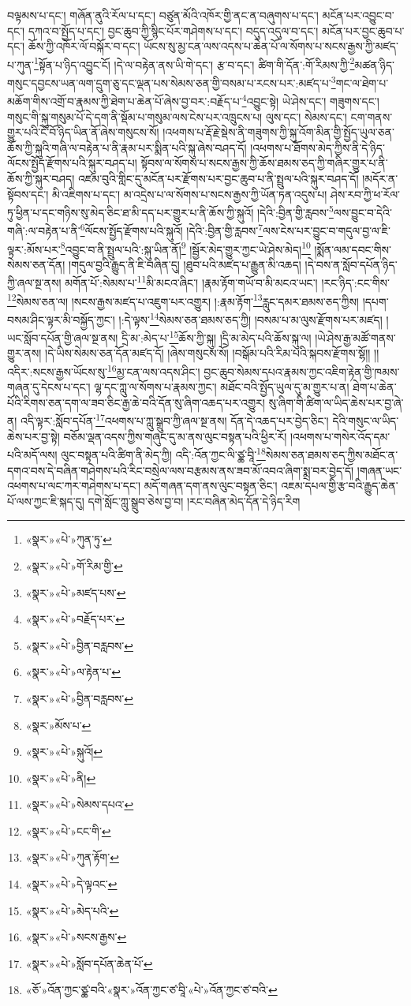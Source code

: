 བལྟམས་པ་དང་། གཞོན་ནུའི་རོལ་པ་དང་། བཙུན་མོའི་འཁོར་གྱི་ནང་ན་བཞུགས་པ་དང་། མངོན་པར་འབྱུང་བ་དང་། དཀའ་བ་སྤྱོད་པ་དང་། བྱང་ཆུབ་ཀྱི་སྙིང་པོར་གཤེགས་པ་དང་། བདུད་འདུལ་བ་དང་། མངོན་པར་བྱང་ཆུབ་པ་དང་། ཆོས་ཀྱི་འཁོར་ལོ་བསྐོར་བ་དང་། ཡོངས་སུ་མྱ་ངན་ལས་འདས་པ་ཆེན་པོ་ལ་སོགས་པ་སངས་རྒྱས་ཀྱི་མཛད་པ་ཀུན་\footnote{«སྣར་»«པེ་»ཀུན་ཏུ་}སྟོན་པ་ཉིད་འབྱུང་ངོ། །དེ་ལ་བརྟེན་ནས་ཡི་གེ་དང་། རྩ་བ་དང་། ཚིག་གི་དོན་:གོ་རིམས་ཀྱི་\footnote{«སྣར་»«པེ་»གོ་རིམ་གྱི་}མཚན་ཉིད་གསུང་དབྱངས་ཡན་ལག་དྲུག་ཅུ་དང་ལྡན་པས་སེམས་ཅན་གྱི་བསམ་པ་རངས་པར་:མཛད་པ་\footnote{«སྣར་»«པེ་»མཛད་པས་}གང་ལ་ཐེག་པ་མཆོག་གིས་འགྲོ་བ་རྣམས་ཀྱི་ཐེག་པ་ཆེན་པོ་ཞེས་བྱ་བར་:བརྗོད་པ་\footnote{«སྣར་»«པེ་»བརྗོད་པར་}འབྱུང་སྟེ། ཡེ་ཤེས་དང་། གཟུགས་དང་། གསུང་གི་སྐུ་གསུམ་པོ་དེ་དག་ནི་སྡོམ་པ་གསུམ་ལས་ངེས་པར་འཁྲུངས་པ། ལུས་དང་། སེམས་དང་། ངག་གནས་གྱུར་པའི་ངོ་བོ་ཉིད་ཡིན་ནོ་ཞེས་གསུངས་སོ། །འཕགས་པ་རྡོ་རྗེ་སྡེས་ནི་གཟུགས་ཀྱི་སྐུ་འོག་མིན་གྱི་སྤྱོད་ཡུལ་ཅན་ཆོས་ཀྱི་སྐུའི་གཞི་ལ་བརྟེན་པ་ནི་རྣམ་པར་སྨིན་པའི་སྐུ་ཞེས་བཤད་དོ། །འཕགས་པ་ཐོགས་མེད་ཀྱིས་ནི་དེ་ཉིད་ལོངས་སྤྱོད་རྫོགས་པའི་སྐུར་བཤད་པ། སྟོབས་ལ་སོགས་པ་སངས་རྒྱས་ཀྱི་ཆོས་ཐམས་ཅད་ཀྱི་གཞིར་གྱུར་པ་ནི་ཆོས་ཀྱི་སྐུར་བཤད། འཛམ་བུའི་གླིང་དུ་མངོན་པར་རྫོགས་པར་བྱང་ཆུབ་པ་ནི་སྤྲུལ་པའི་སྐུར་བཤད་དོ། །མདོར་ན་སྟོབས་དང་། མི་འཇིགས་པ་དང་། མ་འདྲེས་པ་ལ་སོགས་པ་སངས་རྒྱས་ཀྱི་ཡོན་ཏན་འདུས་པ། ཤེས་རབ་ཀྱི་ཕ་རོལ་ཏུ་ཕྱིན་པ་དང་གཉིས་སུ་མེད་ཅིང་ཐ་མི་དད་པར་གྱུར་པ་ནི་ཆོས་ཀྱི་སྐུའོ། །དེའི་:བྱིན་གྱི་རླབས་\footnote{«སྣར་»«པེ་»བྱིན་བརླབས་}ལས་བྱུང་བ་དེའི་གཞི་:ལ་བརྟེན་པ་ནི་\footnote{«སྣར་»«པེ་»ལ་རྟེན་པ་}ལོངས་སྤྱོད་རྫོགས་པའི་སྐུའོ། །དེའི་:བྱིན་གྱི་རླབས་\footnote{«སྣར་»«པེ་»བྱིན་བརླབས་}ལས་ངེས་པར་བྱུང་བ་གདུལ་བྱ་ལ་ཇི་ལྟར་:མོས་པར་\footnote{«སྣར་»མོས་པ་}འབྱུང་བ་ནི་སྤྲུལ་པའི་:སྐུ་ཡིན་ནོ།\footnote{«སྣར་»«པེ་»སྐུའོ།} །སྦྱོར་མེད་གྱུར་ཀྱང་ཡེ་ཤེས་མེད།\footnote{«སྣར་»«པེ་»ནི།} །སྨོན་ལམ་དབང་གིས་སེམས་ཅན་དོན། །གདུལ་བྱའི་རྒྱུད་ནི་ཇི་བཞིན་དུ། །ཐུབ་པའི་མཛད་པ་རྒྱུན་མི་འཆད། །དེ་བས་ན་སློབ་དཔོན་ཉིད་ཀྱི་ཞལ་སྔ་ནས། མགོན་པོ་:སེམས་པ་\footnote{«སྣར་»«པེ་»སེམས་དཔའ་}མི་མངའ་ཞིང་། །རྣམ་རྟོག་གཡོ་བ་མི་མངའ་ཡང་། །རང་ཉིད་:ངང་གིས་\footnote{«སྣར་»«པེ་»ངང་གི་}སེམས་ཅན་ལ། །སངས་རྒྱས་མཛད་པ་འཇུག་པར་འགྱུར། །:རྣམ་རྟོག་\footnote{«སྣར་»«པེ་»ཀུན་རྟོག་}རླུང་དམར་ཐམས་ཅད་ཀྱིས། །དཔག་བསམ་ཤིང་ལྟར་མི་བསྐྱོད་ཀྱང་། །:དེ་ལྟས་\footnote{«སྣར་»«པེ་»དེ་ལྟའང་}སེམས་ཅན་ཐམས་ཅད་ཀྱི། །བསམ་པ་མ་ལུས་རྫོགས་པར་མཛད། །ཡང་སློབ་དཔོན་གྱི་ཞལ་སྔ་ནས། དྲི་མ་:མེད་པ་\footnote{«སྣར་»«པེ་»མེད་པའི་}ཆོས་ཀྱི་སྐུ། །དྲི་མ་མེད་པའི་ཆོས་སྐུ་ལ། །ཡེ་ཤེས་རྒྱ་མཚོ་གནས་གྱུར་ནས། །དེ་ཡིས་སེམས་ཅན་དོན་མཛད་དོ། །ཞེས་གསུངས་སོ། །བསྒོམ་པའི་རིམ་པའི་སྐབས་རྫོགས་སྷོ།། །།འདིར་:སངས་རྒྱས་ཡོངས་སུ་\footnote{«སྣར་»«པེ་»སངས་རྒྱས་}མྱ་ངན་ལས་འདས་ཤིང་། བྱང་ཆུབ་སེམས་དཔའ་རྣམས་ཀྱང་འཇིག་རྟེན་གྱི་ཁམས་གཞན་དུ་དེངས་པ་དང་། ལྷ་དང་ཀླུ་ལ་སོགས་པ་རྣམས་ཀྱང་། མཐོང་བའི་སྤྱོད་ཡུལ་དུ་མ་གྱུར་པ་ན། ཐེག་པ་ཆེན་པོའི་རིགས་ཅན་དག་ལ་ཟབ་ཅིང་རྒྱ་ཆེ་བའི་དོན་སུ་ཞིག་འཆད་པར་འགྱུར། སུ་ཞིག་གི་ཚིག་ལ་ཡིད་ཆེས་པར་བྱ་ཞེ་ན། འདི་ལྟར་:སློབ་དཔོན་\footnote{«སྣར་»«པེ་»སློབ་དཔོན་ཆེན་པོ་}འཕགས་པ་ཀླུ་སྒྲུབ་ཀྱི་ཞལ་སྔ་ནས། དོན་དེ་འཆད་པར་བྱེད་ཅིང་། དེའི་གསུང་ལ་ཡིད་ཆེས་པར་བྱ་སྟེ། བཅོམ་ལྡན་འདས་ཀྱིས་གཞུང་དུ་མ་ནས་ལུང་བསྟན་པའི་ཕྱིར་རོ། །འཕགས་པ་གསེར་འོད་དམ་པའི་མདོ་ལས། ལུང་བསྟན་པའི་ཚིག་ནི་མེད་ཀྱི། འདི་:འོན་ཀྱང་ལི་ཙྪ་བཱི་\footnote{«ཅོ་»འོན་ཀྱང་ཙྪ་བའི་«སྣར་»འོན་ཀྱང་ཙ་བཱི་«པེ་»འོན་ཀྱང་ཙ་བའི་}སེམས་ཅན་ཐམས་ཅད་ཀྱིས་མཐོང་ན་དགའ་བས་དེ་བཞིན་གཤེགས་པའི་རིང་བསྲེལ་ལས་བརྩམས་ནས་ཟབ་མོ་འབའ་ཞིག་སྨྲ་བར་བྱེད་དོ། །གཞན་ཡང་འཕགས་པ་ལང་ཀར་གཤེགས་པ་དང་། མདོ་གཞན་དག་ནས་ལུང་བསྟན་ཅིང་། འཇམ་དཔལ་གྱི་རྩ་བའི་རྒྱུད་ཆེན་པོ་ལས་ཀྱང་ཇི་སྐད་དུ། དགེ་སློང་ཀླུ་སྒྲུབ་ཅེས་བྱ་བ། །རང་བཞིན་མེད་དོན་དེ་ཉིད་རིག 
